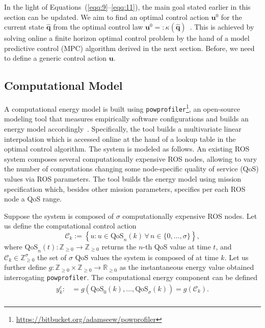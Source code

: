 \documentclass[letterpaper,10pt,conference]{ieeeconf}
\newcommand{\stt}[1]{{\small\tt #1}} %
\newcommand{\powprof}{\stt{powprofiler}}
\begin{document}
In the light of Equations~(\ref{eqq:9}--\ref{eqq:11}), the main goal stated earlier in this section can be updated. We aim to find an optimal control action $\mathbf{u}^0$ for the current state $\hat{\mathbf{q}}$ from the optimal control law $\mathbf{u}^0=:\kappa(\hat{\mathbf{q}})$~\cite{rawlings2017model}. This is achieved by solving online a finite horizon optimal control problem by the hand of a model predictive control (MPC) algorithm derived in the next section. Before, we need to define a generic control action $\mathbf{u}$.

\subsection{Computational Model}

A computational energy model is built using \powprof{}\footnote{\label{cross-ref:powprof-link}\url{https://bitbucket.org/adamseew/powprofiler}}, an open-source modeling tool that measures empirically software configurations and builds an energy model accordingly~\cite{seewald2019coarse}. Specifically, the tool builds a multivariate linear interpolation which is accessed online at the hand of a lookup table in the optimal control algorithm. The system is modeled as follows. An existing ROS system composes several computationally expensive ROS nodes, allowing to vary the number of computations changing some node-specific quality of service (QoS) values via ROS parameters. The tool builds the energy model using mission specification which, besides other mission parameters, specifies per each ROS node a QoS range.

Suppose the system is composed of $\sigma$ computationally expensive ROS nodes. Let us define the computational control action
\begin{equation}\label{eqq:12}
  \mathcal{C}_k:=\left\{u:u\in\text{QoS}_n(k)\,\forall\,n\in\{0,\dots,\sigma\}\right\},
\end{equation}
where $\text{QoS}_n(t):\mathbb{Z}_{\geq 0}\rightarrow\mathbb{Z}_{\geq 0}$ returns the $n$-th QoS value at time $t$, and $\mathcal{C}_k\in\mathbb{Z}_{\geq 0}^\sigma$ the set of $\sigma$ QoS values the system is composed of at time $k$. Let us further define $g:\mathbb{Z}_{\geq 0}\times\mathbb{Z}_{\geq 0}\rightarrow\mathbb{R}_{\geq 0}$ as the instantaneous energy value obtained interrogating \powprof{}. The computational energy component can be defined
\begin{equation}\label{eqq:13}\begin{split}
  y_k^c:&=g\left(\text{QoS}_0\left(k\right),\dots,\text{QoS}_\sigma\left(k\right)\right)=g\left(\mathcal{C}_{k}\right).\\
\end{split}\end{equation}
\end{document}
